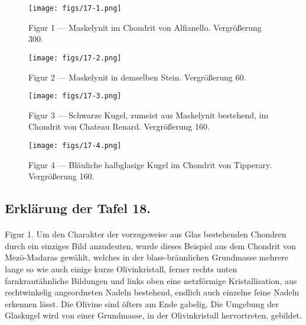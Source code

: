 \documentclass[a4paper, 11pt, oneside, polutonikogreek, german]{article}
\begin{document}
\vspace*{\fill}
\begin{figure}[H]
\centering
\texttt{[image: figs/17-1.png]}
\caption{\small Figur 1 --- Maskelynit im Chondrit von Alfianello. Vergrößerung 300.}
\end{figure}
\vspace*{\fill}
\clearpage

\vspace*{\fill}
\begin{figure}[H]
\centering
\texttt{[image: figs/17-2.png]}
\caption{\small Figur 2 --- Maskelynit in demselben Stein. Vergrößerung 60.}
\end{figure}
\vspace*{\fill}
\clearpage

\vspace*{\fill}
\begin{figure}[H]
\centering
\texttt{[image: figs/17-3.png]}
\caption{\small Figur 3 --- Schwarze Kugel, zumeist aus Maskelynit bestehend, im Chondrit von Chateau Renard. Vergrößerung 160.}
\end{figure}
\vspace*{\fill}
\clearpage

\vspace*{\fill}
\begin{figure}[H]
\centering
\texttt{[image: figs/17-4.png]}
\caption{\small Figur 4 --- Bläuliche halbglasige Kugel im Chondrit von Tipperary. Vergrößerung 160.}
\end{figure}
\vspace*{\fill}
\clearpage

\subsection{Erklärung der Tafel 18.}
\paragraph{}
Figur 1. Um den Charakter der vorzugsweise aus Glas bestehenden Chondren durch ein einziges Bild anzudeuten, wurde dieses Beispiel aus dem Chondrit von Mezö-Madaras gewählt, welches in der blass-bräunlichen Grundmasse mehrere lange so wie auch einige kurze Olivinkristall, ferner rechts unten farnkrautähnliche Bildungen und links oben eine netzförmige Kristallisation, aus rechtwinkelig angeordneten Nadeln bestehend, endlich auch einzelne feine Nadeln erkennen lässt. Die Olivine sind öfters am Ende gabelig. Die Umgebung der Glaskugel wird von einer Grundmasse, in der Olivinkristall hervortreten, gebildet.
\end{document}
